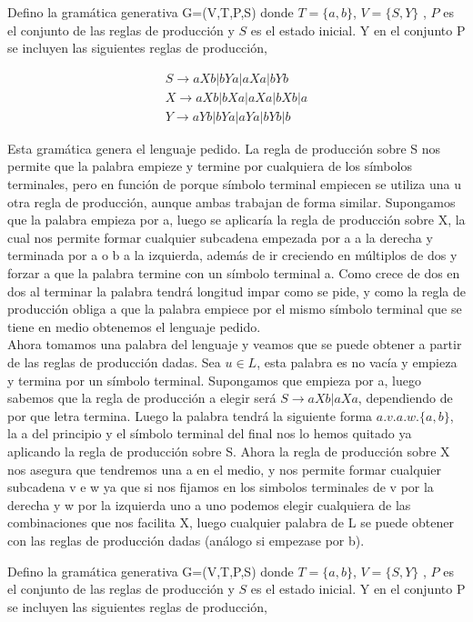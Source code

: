\documentclass[a4paper,11pt]{article}
\begin{document}
Defino la gramática generativa G=(V,T,P,S) donde $T=\{a,b\}$, $V=\{S,Y\}$ , $P$ es el conjunto de las reglas de producción y $S$ es el estado inicial. Y en el conjunto P se incluyen las siguientes reglas de producción, 

\begin{align*}
S \rightarrow aXb|bYa|aXa|bYb \\
X \rightarrow aXb|bXa|aXa|bXb|a \\
Y \rightarrow aYb|bYa|aYa|bYb|b
\end{align*}

Esta gramática genera el lenguaje pedido. La regla de producción sobre S nos permite que la palabra empieze y termine por cualquiera de los símbolos terminales, pero en función de porque símbolo terminal empiecen se utiliza una u otra regla de producción, aunque ambas trabajan de forma similar. Supongamos que la palabra empieza por a, luego se aplicaría la regla de producción sobre X, la cual nos permite formar cualquier subcadena empezada por a a la derecha y terminada por a o b a la izquierda, además de ir creciendo en múltiplos de dos y forzar a que la palabra termine con un símbolo terminal a. Como crece de dos en dos al terminar la palabra tendrá longitud impar como se pide, y como la regla de producción obliga a que la palabra empiece por el mismo símbolo terminal que se tiene en medio obtenemos el lenguaje pedido. \\

Ahora tomamos una palabra del lenguaje y veamos que se puede obtener a partir de las reglas de producción dadas. Sea $u \in L$, esta palabra es no vacía y empieza y termina por un símbolo terminal. Supongamos que empieza por a, luego sabemos que la regla de producción a elegir será $S \rightarrow aXb | aXa$, dependiendo de por que letra termina. Luego la palabra tendrá la siguiente forma $a.v.a.w.\{a,b\}$, la a del principio y el símbolo terminal del final nos lo hemos quitado ya aplicando la regla de producción sobre S. Ahora la regla de producción sobre X nos asegura que tendremos una a en el medio, y nos permite formar cualquier subcadena v e w ya que si nos fijamos en los simbolos terminales de v por la derecha y w por la izquierda uno a uno podemos elegir cualquiera de las combinaciones que nos facilita X, luego cualquier palabra de L se puede obtener con las reglas de producción dadas (análogo si empezase por b).


Defino la gramática generativa G=(V,T,P,S) donde $T=\{a,b\}$, $V=\{S,Y\}$ , $P$ es el conjunto de las reglas de producción y $S$ es el estado inicial. Y en el conjunto P se incluyen las siguientes reglas de producción, 
\end{document}
